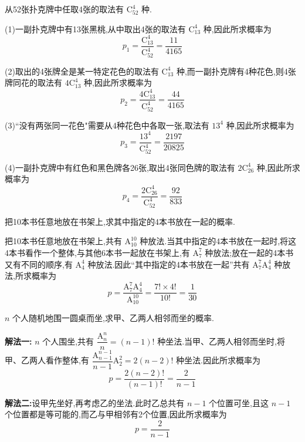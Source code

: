 \begin{solution}
    从52张扑克牌中任取4张的取法有 $\mathrm{C}_{52}^4$ 种.

    (1)一副扑克牌中有13张黑桃,从中取出4张的取法有 $\mathrm{C}_{13}^4$ 种,因此所求概率为
    $$
    p_1 = \dfrac{\mathrm{C}_{13}^4}{\mathrm{C}_{52}^4} = \dfrac{11}{4165}
    $$

    (2)取出的4张牌全是某一特定花色的取法有 $\mathrm{C}_{13}^4$ 种,而一副扑克牌有4种花色,则4张牌同花的取法有 $4 \mathrm{C}_{13}^4$ 种,因此所求概率为
    $$
    p_2 = \dfrac{4 \mathrm{C}_{13}^4}{\mathrm{C}_{52}^4} = \dfrac{44}{4165}
    $$

    (3)``没有两张同一花色"需要从4种花色中各取一张,取法有 $13^4$ 种,因此所求概率为
    $$
    p_3 = \dfrac{13^4}{\mathrm{C}_{52}^4} = \dfrac{2197}{20825}
    $$

    (4)一副扑克牌中有红色和黑色牌各26张,取出4张同色牌的取法有 $2 \mathrm{C}_{26}^4$ 种,因此所求概率为
    $$
    p_4 = \dfrac{2 \mathrm{C}_{26}^4}{\mathrm{C}_{52}^4} = \dfrac{92}{833}
    $$
\end{solution}

\question 把10本书任意地放在书架上,求其中指定的4本书放在一起的概率.

\begin{solution}
    把10本书任意地放在书架上,共有 $\mathrm{A}_{10}^{10}$ 种放法.当其中指定的4本书放在一起时,将这4本书看作一个整体,与其他6本书一起放在书架上,有 $\mathrm{A}_7^7$ 种放法;放在一起的4本书又有不同的顺序,有 $\mathrm{A}_4^4$ 种放法.因此``其中指定的4本书放在一起''共有 $\mathrm{A}_7^7 \mathrm{A}_4^4$ 种放法,所求概率为
    $$
    p = \dfrac{\mathrm{A}_7^7 \mathrm{A}_4^4}{\mathrm{A}_{10}^{10}} = \dfrac{7! \times 4!}{10!} = \dfrac{1}{30}
    $$
\end{solution}

\question $n$ 个人随机地围一圆桌而坐,求甲、乙两人相邻而坐的概率.

\begin{solution}

    \textbf{解法一:} $n$ 个人围坐,共有 $\dfrac{\mathrm{A}_n^n}{n} = (n-1)!$ 种坐法.当甲、乙两人相邻而坐时,将甲、乙两人看作整体,有 $\dfrac{\mathrm{A}_{n-1}^{n-1}}{n-1} \mathrm{A}_2^2 = 2(n-2)!$ 种坐法.因此所求概率为
    $$
    p = \dfrac{2(n-2)!}{(n-1)!} = \dfrac{2}{n-1}
    $$

    \textbf{解法二:}设甲先坐好,再考虑乙的坐法.此时乙总共有 $n-1$ 个位置可坐,且这 $n-1$ 个位置都是等可能的,而乙与甲相邻有2个位置,因此所求概率为
    $$
    p = \dfrac{2}{n-1}
    $$
\end{solution}

